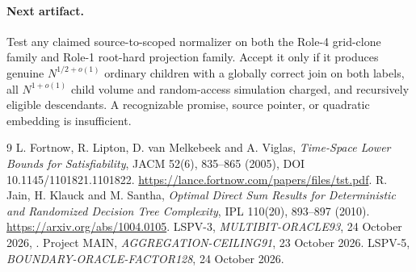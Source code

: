 \documentclass[11pt]{article}
\begin{document}
\paragraph{Next artifact.}
Test any claimed source-to-scoped normalizer on both the Role-4 grid-clone
family and Role-1 root-hard projection family.  Accept it only if it produces
genuine $N^{1/2+o(1)}$ ordinary children with a globally correct join on both
labels, all $N^{1+o(1)}$ child volume and random-access simulation charged,
and recursively eligible descendants.  A recognizable promise, source
pointer, or quadratic embedding is insufficient.

\begin{thebibliography}{9}
L. Fortnow, R. Lipton, D. van Melkebeek and A. Viglas,
\emph{Time-Space Lower Bounds for Satisfiability}, JACM 52(6), 835--865
(2005), DOI 10.1145/1101821.1101822.
\url{https://lance.fortnow.com/papers/files/tst.pdf}.
R. Jain, H. Klauck and M. Santha,
\emph{Optimal Direct Sum Results for Deterministic and Randomized Decision
Tree Complexity}, IPL 110(20), 893--897 (2010).
\url{https://arxiv.org/abs/1004.0105}.
LSPV-3, \emph{MULTIBIT-ORACLE93}, 24 October 2026,
.
Project MAIN, \emph{AGGREGATION-CEILING91}, 23 October 2026.
LSPV-5, \emph{BOUNDARY-ORACLE-FACTOR128}, 24 October 2026.
\end{thebibliography}
\end{document}

